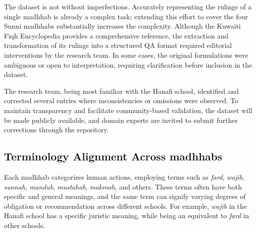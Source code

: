 \documentclass[letterpaper]{article}
\begin{document}
The dataset is not without imperfections. Accurately representing the rulings of a single madhhab is already a complex task; extending this effort to cover the four Sunni madhhabs substantially increases the complexity. Although the Kuwaiti Fiqh Encyclopedia provides a comprehensive reference, the extraction and transformation of its rulings into a structured QA format required editorial interventions by the research team. In some cases, the original formulations were ambiguous or open to interpretation, requiring clarification before inclusion in the dataset.

The research team, being most familiar with the Hanafi school, identified and corrected several entries where inconsistencies or omissions were observed. To maintain transparency and facilitate community-based validation, the dataset will be made publicly available, and domain experts are invited to submit further corrections through the repository.


\subsection{Terminology Alignment Across madhhabs}

Each madhhab categorizes human actions, employing terms such as \textit{fard}, \textit{wajib}, \textit{sunnah}, \textit{mandub}, \textit{mustahab}, \textit{makrooh}, and others. These terms often have both specific and general meanings, and the same term can signify varying degrees of obligation or recommendation across different schools. For example, \textit{wajib} in the Hanafi school has a specific juristic meaning, while being an equivalent to \textit{fard} in other schools.
\end{document}
